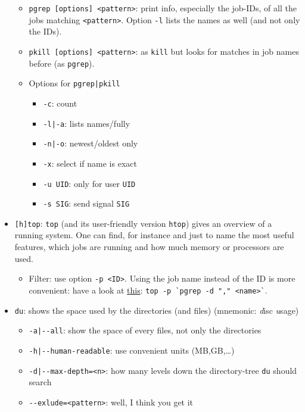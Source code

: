 \documentclass[a4paper,12pt,%
              final%
              ]{article}
\begin{document}
\begin{itemize}
\begin{itemize}
      \item \verb|pgrep [options] <pattern>|: print info, especially the job-IDs, of all the jobs matching \verb|<pattern>|. Option \verb|-l| lists the names as well (and not only the IDs).
      \item \verb|pkill [options] <pattern>|: as \verb|kill| but looks for matches in job names before (as \verb|pgrep|).
      \item Options for \verb!pgrep|pkill!
        \begin{itemize}
          \item \verb|-c|: count
          \item \verb!-l|-a!: lists names/fully
          \item \verb!-n|-o!: newest/oldest only
          \item \verb|-x|: select if name is exact
          \item \verb|-u UID|: only for user \verb|UID|
          \item \verb|-s SIG|: send signal \verb|SIG|
        \end{itemize}
    \end{itemize}
  \item \verb|[h]top|: \verb|top| (and its user-friendly version \verb|htop|) gives an overview of a running system. One can find, for instance and just to name the most useful features, which jobs are running and how much memory or processors are used.
    \begin{itemize}
      \item Filter: use option \verb|-p <ID>|. Using the job name instead of the ID is more convenient: have a look at \href{https://unix.stackexchange.com/a/347544}{this}: \verb|top -p `pgrep -d "," <name>`|.
    \end{itemize}
  \item \texttt{du}: shows the space used by the directories (and files) (mnemonic: \emph{d}isc \emph{u}sage)
    \begin{itemize}
      \item \verb!-a|--all!: show the space of every files, not only the directories
      \item \verb!-h|--human-readable!: use convenient units (MB,GB,\ldots)
      \item \verb!-d|--max-depth=<n>!: how many levels down the directory-tree \texttt{du} should search
      \item \verb|--exlude=<pattern>|: well, I think you get it
    \end{itemize}

\end{itemize}
\end{document}
